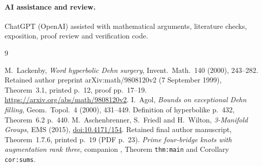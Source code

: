 \documentclass[11pt]{article}
\begin{document}
\paragraph{AI assistance and review.}
ChatGPT (OpenAI) assisted with mathematical arguments, literature checks,
exposition, proof review and verification code.

\begin{thebibliography}{9}\small\raggedright
{} M.~Lackenby, \emph{Word hyperbolic Dehn surgery},
Invent.~Math.~140 (2000), 243--282. Retained author preprint
arXiv:math/9808120v2 (7 September 1999), Theorem~3.1, printed p.~12,
proof pp.~17--19. \url{https://arxiv.org/abs/math/9808120v2}.
 I.~Agol, \emph{Bounds on exceptional Dehn filling},
Geom.~Topol.~4 (2000), 431--449. Definition of hyperbolike p.~432,
Theorem~6.2 p.~440.
 M.~Aschenbrenner, S.~Friedl and H.~Wilton,
\emph{3-Manifold Groups}, EMS (2015),
\href{https://doi.org/10.4171/154}{doi:10.4171/154}.
Retained final author manuscript, Theorem~1.7.6, printed p.~19
(PDF p.~23).
 \emph{Prime four-bridge knots with augmentation rank
three}, companion ,
Theorem \texttt{thm:main} and Corollary \texttt{cor:sums}.
\end{thebibliography}
\end{document}

